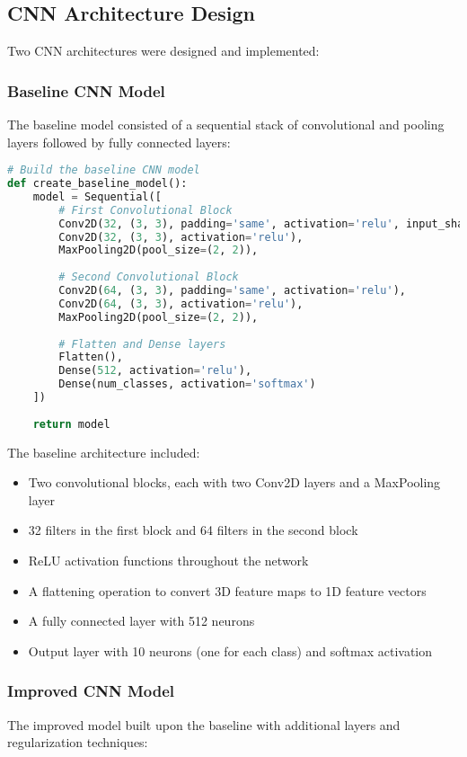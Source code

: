 \documentclass[12pt]{article}
\begin{document}
\subsection{CNN Architecture Design}
Two CNN architectures were designed and implemented:

\subsubsection{Baseline CNN Model}
The baseline model consisted of a sequential stack of convolutional and pooling layers followed by fully connected layers:

\begin{lstlisting}[language=Python, caption=Baseline CNN Architecture]
# Build the baseline CNN model
def create_baseline_model():
    model = Sequential([
        # First Convolutional Block
        Conv2D(32, (3, 3), padding='same', activation='relu', input_shape=(32, 32, 3)),
        Conv2D(32, (3, 3), activation='relu'),
        MaxPooling2D(pool_size=(2, 2)),
        
        # Second Convolutional Block
        Conv2D(64, (3, 3), padding='same', activation='relu'),
        Conv2D(64, (3, 3), activation='relu'),
        MaxPooling2D(pool_size=(2, 2)),
        
        # Flatten and Dense layers
        Flatten(),
        Dense(512, activation='relu'),
        Dense(num_classes, activation='softmax')
    ])
    
    return model
\end{lstlisting}

The baseline architecture included:
\begin{itemize}
    \item Two convolutional blocks, each with two Conv2D layers and a MaxPooling layer
    \item 32 filters in the first block and 64 filters in the second block
    \item ReLU activation functions throughout the network
    \item A flattening operation to convert 3D feature maps to 1D feature vectors
    \item A fully connected layer with 512 neurons
    \item Output layer with 10 neurons (one for each class) and softmax activation
\end{itemize}

\subsubsection{Improved CNN Model}
The improved model built upon the baseline with additional layers and regularization techniques:
\end{document}
